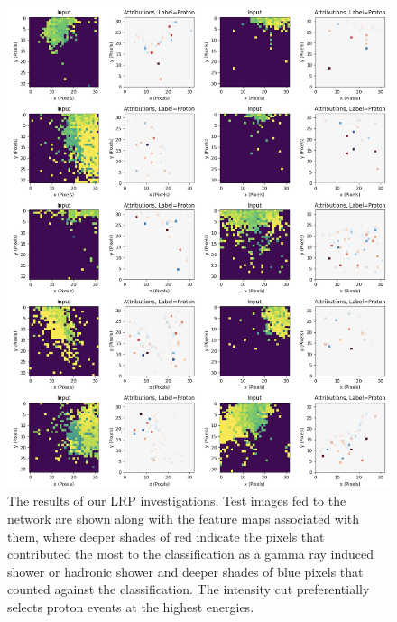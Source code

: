 \begin{figure}[ht] 
        \centering \includegraphics[width=1.0\columnwidth]{figures/newexpchec2.png}

        \caption{
                \label{fig:lrp} %
                The results of our LRP investigations. Test images fed to the network are shown along with the feature maps associated with them, where deeper shades of red indicate the pixels that contributed the most to the classification as a gamma ray induced shower or hadronic shower and deeper shades of blue pixels that counted against the classification. The intensity cut preferentially selects proton events at the highest energies.
        }
\end{figure}

